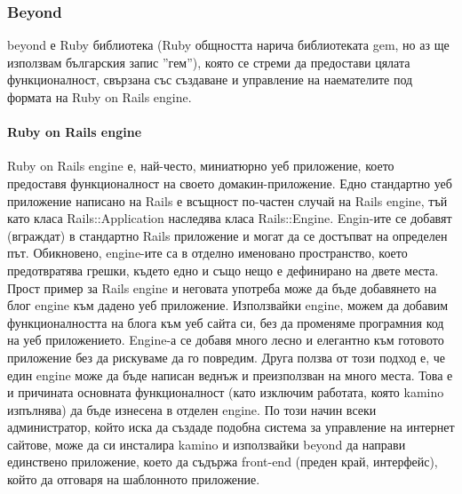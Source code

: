 \documentclass[pdftex,14pt,a4paper]{extreport}
\begin{document}
\subsubsection {Beyond}
beyond е Ruby библиотека (Ruby общността нарича библиотеката gem, но аз ще използвам българския запис ''гем''), която се стреми да предостави цялата функционалност, свързана със създаване и управление на наемателите под формата на Ruby on Rails engine.
\paragraph {Ruby on Rails engine}
Ruby on Rails engine е, най-често, миниатюрно уеб приложение, което предоставя функционалност на своето домакин-приложение. Едно стандартно уеб приложение написано на Rails е всъщност по-частен случай на Rails engine, тъй като класа Rails::Application наследява класа Rails::Engine. Engin-ите се добавят (вграждат) в стандартно Rails приложение и могат да се достъпват на определен път. Обикновено, engine-ите са в отделно именовано пространство, което предотвратява грешки, където едно и също нещо е дефинирано на двете места. Прост пример за Rails engine и неговата употреба може да бъде добавянето на блог engine към дадено уеб приложение. Използвайки engine, можем да добавим функционалността на блога към уеб сайта си, без да променяме програмния код на уеб приложението. Engine-а се добавя много лесно и елегантно към готовото приложение без да рискуваме да го повредим. Друга ползва от този подход е, че един engine може да бъде написан веднъж и преизползван на много места. Това е и причината основната функционалност (като изключим работата, която kamino изпълнява) да бъде изнесена в отделен engine. По този начин всеки администратор, който иска да създаде подобна система за управление на интернет сайтове, може да си инсталира kamino и използвайки beyond да направи единствено приложение, което да съдържа front-end (преден край, интерфейс), който да отговаря на шаблонното приложение.
\end{document}
